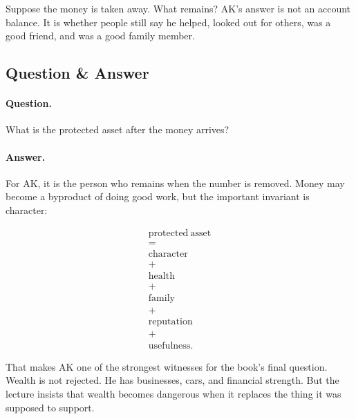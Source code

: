 \documentclass[11pt,oneside]{book}
\begin{document}
Suppose the money is taken away. What remains? AK's answer is not an account balance. It is whether people still say he helped, looked out for others, was a good friend, and was a good family member.

\subsection{Question \& Answer}

\paragraph{Question.}
What is the protected asset after the money arrives?

\paragraph{Answer.}
For AK, it is the person who remains when the number is removed. Money may become a byproduct of doing good work, but the important invariant is character:

\begin{equation}
\begin{gathered}
\mathrm{protected\ asset}\\
=\\
\mathrm{character}\\
+\\
\mathrm{health}\\
+\\
\mathrm{family}\\
+\\
\mathrm{reputation}\\
+\\
\mathrm{usefulness}.
\end{gathered}
\end{equation}

That makes AK one of the strongest witnesses for the book's final question. Wealth is not rejected. He has businesses, cars, and financial strength. But the lecture insists that wealth becomes dangerous when it replaces the thing it was supposed to support.

\end{document}
